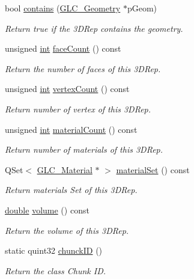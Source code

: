 \begin{DoxyCompactItemize}
bool \hyperlink{class_g_l_c__3_d_rep_abc9ba965b51e7d619653caee712fd11c}{contains} (\hyperlink{class_g_l_c___geometry}{G\-L\-C\-\_\-\-Geometry} $\ast$p\-Geom)
\begin{DoxyCompactList}\small\item\em Return true if the 3\-D\-Rep contains the geometry. \end{DoxyCompactList}\item 
unsigned \hyperlink{ioapi_8h_a787fa3cf048117ba7123753c1e74fcd6}{int} \hyperlink{class_g_l_c__3_d_rep_af8cbe5fb15a6ff2eefe2a8f52089d69f}{face\-Count} () const 
\begin{DoxyCompactList}\small\item\em Return the number of faces of this 3\-D\-Rep. \end{DoxyCompactList}\item 
unsigned \hyperlink{ioapi_8h_a787fa3cf048117ba7123753c1e74fcd6}{int} \hyperlink{class_g_l_c__3_d_rep_a385803eca1c20164788827428dae6392}{vertex\-Count} () const 
\begin{DoxyCompactList}\small\item\em Return number of vertex of this 3\-D\-Rep. \end{DoxyCompactList}\item 
unsigned \hyperlink{ioapi_8h_a787fa3cf048117ba7123753c1e74fcd6}{int} \hyperlink{class_g_l_c__3_d_rep_a492b242fb26481dda80da39c52251445}{material\-Count} () const 
\begin{DoxyCompactList}\small\item\em Return number of materials of this 3\-D\-Rep. \end{DoxyCompactList}\item 
Q\-Set$<$ \hyperlink{class_g_l_c___material}{G\-L\-C\-\_\-\-Material} $\ast$ $>$ \hyperlink{class_g_l_c__3_d_rep_ab4c63807d79e3a69b813ae78d375135f}{material\-Set} () const 
\begin{DoxyCompactList}\small\item\em Return materials Set of this 3\-D\-Rep. \end{DoxyCompactList}\item 
\hyperlink{_super_l_u_support_8h_a8956b2b9f49bf918deed98379d159ca7}{double} \hyperlink{class_g_l_c__3_d_rep_aca0559a215917ef5c0b7267a9b072426}{volume} () const 
\begin{DoxyCompactList}\small\item\em Return the volume of this 3\-D\-Rep. \end{DoxyCompactList}\item 
static quint32 \hyperlink{class_g_l_c__3_d_rep_a9c23e6d9cd1e087e304a26911604e65c}{chunck\-I\-D} ()
\begin{DoxyCompactList}\small\item\em Return the class Chunk I\-D. \end{DoxyCompactList}\end{DoxyCompactItemize}
